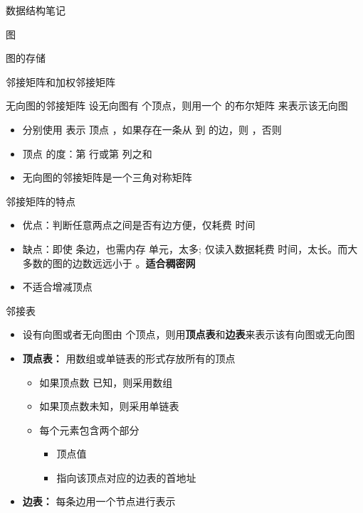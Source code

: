 \documentclass[
  ignorenonframetext,
]{beamer}
\providecommand{\tightlist}{%
  \setlength{\itemsep}{0pt}\setlength{\parskip}{0pt}}
\begin{document}
\begin{frame}[fragile]{数据结构笔记}
\begin{block}{图}
\begin{block}{图的存储}
\begin{block}{邻接矩阵和加权邻接矩阵}
\begin{block}{无向图的邻接矩阵}
\protect{}\label{ux65e0ux5411ux56feux7684ux90bbux63a5ux77e9ux9635}
设无向图有 {} 个顶点，则用一个 {} 的布尔矩阵 {} 来表示该无向图


\begin{itemize}
\tightlist
\item
  分别使用 {} 表示 顶点 {}，如果存在一条从 {} 到 {} 的边，则 {}，否则 {}
\item
  顶点 {} 的度：第 {} 行或第 {} 列之和
\item
  无向图的邻接矩阵是一个三角对称矩阵
\end{itemize}
\end{block}

\begin{block}{邻接矩阵的特点}
\protect{}\label{ux90bbux63a5ux77e9ux9635ux7684ux7279ux70b9}
\begin{itemize}
\tightlist
\item
  优点：判断任意两点之间是否有边方便，仅耗费 {} 时间
\item
  缺点：即使 {} 条边，也需内存 {} 单元，太多; 仅读入数据耗费 {}
  时间，太长。而大多数的图的边数远远小于 {}。\textbf{适合稠密网}
\item
  不适合增减顶点
\end{itemize}
\end{block}
\end{block}

\begin{block}{邻接表}
\protect{}\label{ux90bbux63a5ux8868}
\begin{itemize}
\item
  设有向图或者无向图由 {}
  个顶点，则用\textbf{顶点表}和\textbf{边表}来表示该有向图或无向图
\item
  \textbf{顶点表：} 用数组或单链表的形式存放所有的顶点

  \begin{itemize}
  \tightlist
  \item
    如果顶点数 {} 已知，则采用数组
  \item
    如果顶点数未知，则采用单链表
  \item
    每个元素包含两个部分

    \begin{itemize}
    \tightlist
    \item
      顶点值
    \item
      指向该顶点对应的边表的首地址
    \end{itemize}
  \end{itemize}
\item
  \textbf{边表：} 每条边用一个节点进行表示


\end{itemize}
\end{block}
\end{block}
\end{block}
\end{frame}
\end{document}
